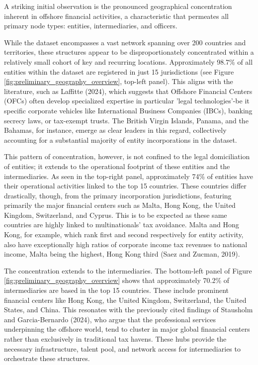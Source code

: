 A striking initial observation is the pronounced geographical concentration inherent in offshore financial activities, a characteristic that permeates all primary node types: entities, intermediaries, and officers.

While the dataset encompasses a vast network spanning over 200 countries and territories, these structures appear to be disproportionately concentrated within a relatively small cohort of key and recurring locations. Approximately 98.7\% of all entities within the dataset are registered in just 15 jurisdictions (see Figure \ref{fig:preliminary_geography_overview}, top-left panel). This aligns with the literature, such as Laffitte (2024), which suggests that Offshore Financial Centers (OFCs) often develop specialized expertise in particular 'legal technologies'-be it specific corporate vehicles like International Business Companies (IBCs), banking secrecy laws, or tax-exempt trusts. The British Virgin Islands, Panama, and the Bahamas, for instance, emerge as clear leaders in this regard, collectively accounting for a substantial majority of entity incorporations in the dataset.

This pattern of concentration, however, is not confined to the legal domiciliation of entities; it extends to the operational footprint of these entities and the intermediaries. As seen in the top-right panel, approximately 74\% of entities have their operational activities linked to the top 15 countries. These countries differ drastically, though, from the primary incorporation jurisdictions, featuring primarily the major financial centers such as Malta, Hong Kong, the United Kingdom, Switzerland, and Cyprus. This is to be expected as these same countries are highly linked to multinationals' tax avoidance. Malta and Hong Kong, for example, which rank first and second respectively for entity activity, also have exceptionally high ratios of corporate income tax revenues to national income, Malta being the highest, Hong Kong third (Saez and Zucman, 2019). 

The concentration extends to the intermediaries. The bottom-left panel of Figure \ref{fig:preliminary_geography_overview} shows that approximately 70.2\% of intermediaries are based in the top 15 countries. These include prominent financial centers like Hong Kong, the United Kingdom, Switzerland, the United States, and China. This resonates with the previously cited findings of Stausholm and Garcia-Bernardo (2024), who argue that the professional services underpinning the offshore world, tend to cluster in major global financial centers rather than exclusively in traditional tax havens. These hubs provide the necessary infrastructure, talent pool, and network access for intermediaries to orchestrate these structures.

